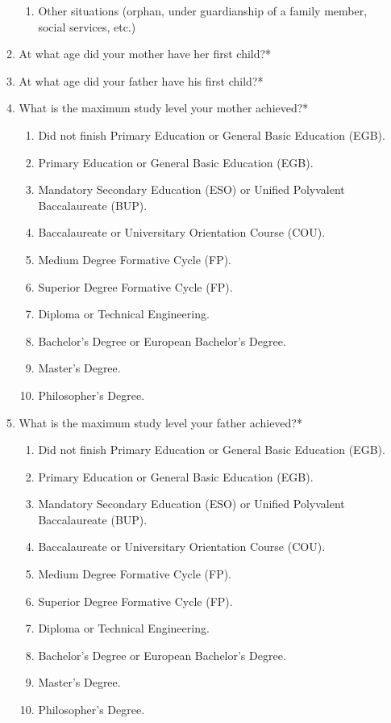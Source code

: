 \documentclass[12pt]{article}
\begin{document}
\begin{enumerate}
\begin{enumerate}
\begin{enumerate}
\item Other situations (orphan, under guardianship of a family member, social services, etc.)
\end{enumerate}
\item At what age did your mother have her first child?*
\item At what age did your father have his first child?*
\item What is the maximum study level your mother achieved?*
\begin{enumerate}
\item Did not finish Primary Education or General Basic Education (EGB).
\item Primary Education or General Basic Education (EGB).
\item Mandatory Secondary Education (ESO) or Unified Polyvalent Baccalaureate (BUP).
\item Baccalaureate or Universitary Orientation Course (COU).
\item Medium Degree Formative Cycle (FP).
\item Superior Degree Formative Cycle (FP).
\item Diploma or Technical Engineering.
\item Bachelor's Degree or European Bachelor's Degree.
\item Master's Degree.
\item Philosopher's Degree.
\end{enumerate}
\item What is the maximum study level your father achieved?*
\begin{enumerate}
\item Did not finish Primary Education or General Basic Education (EGB).
\item Primary Education or General Basic Education (EGB).
\item Mandatory Secondary Education (ESO) or Unified Polyvalent Baccalaureate (BUP).
\item Baccalaureate or Universitary Orientation Course (COU).
\item Medium Degree Formative Cycle (FP).
\item Superior Degree Formative Cycle (FP).
\item Diploma or Technical Engineering.
\item Bachelor's Degree or European Bachelor's Degree.
\item Master's Degree.
\item Philosopher's Degree.
\end{enumerate}

\end{enumerate}
\end{enumerate}
\end{document}
